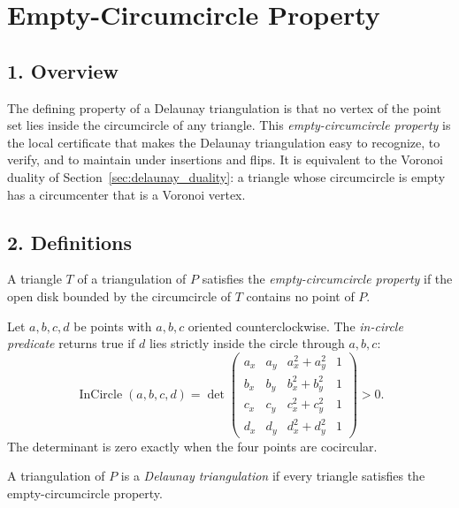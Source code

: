 \section{Empty-Circumcircle Property}
\label{sec:delaunay_empty_circumcircle}

\subsection{1. Overview}

The defining property of a Delaunay triangulation is that no vertex of the point
set lies inside the circumcircle of any triangle. This 
\emph{empty-circumcircle property} is the local certificate that makes the
Delaunay triangulation easy to recognize, to verify, and to maintain under
insertions and flips. It is equivalent to the Voronoi duality of
Section~\ref{sec:delaunay_duality}: a triangle whose circumcircle is empty has a
circumcenter that is a Voronoi vertex.

\subsection{2. Definitions}

\begin{definition}\label{def:empty_circumcircle}
A triangle $T$ of a triangulation of $P$ satisfies the \emph{empty-circumcircle
property} if the open disk bounded by the circumcircle of $T$ contains no point
of $P$.
\end{definition}

\begin{definition}\label{def:incircle}
Let $a,b,c,d$ be points with $a,b,c$ oriented counterclockwise. The
\emph{in-circle predicate} returns true if $d$ lies strictly inside the circle
through $a,b,c$:
\[
\operatorname{InCircle}(a,b,c,d) =
\det
\begin{pmatrix}
a_x & a_y & a_x^2 + a_y^2 & 1\\
b_x & b_y & b_x^2 + b_y^2 & 1\\
c_x & c_y & c_x^2 + c_y^2 & 1\\
d_x & d_y & d_x^2 + d_y^2 & 1
\end{pmatrix}
> 0.
\]
The determinant is zero exactly when the four points are cocircular.
\end{definition}

\begin{definition}\label{def:delaunay_triangulation}
A triangulation of $P$ is a \emph{Delaunay triangulation} if every triangle
satisfies the empty-circumcircle property.
\end{definition}

